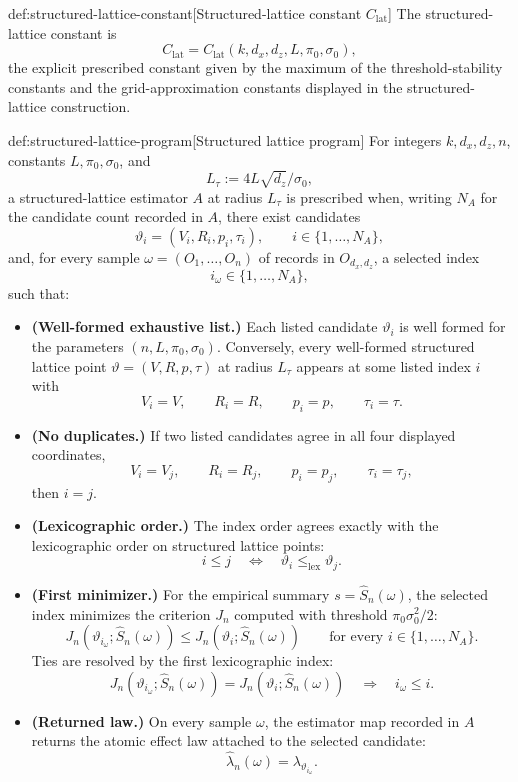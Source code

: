\documentclass[11pt]{article}
\begin{document}
\begin{definitionv}{def:structured-lattice-constant}[Structured-lattice constant \(C_{\mathrm{lat}}\)]
The structured-lattice constant is
\[
C_{\mathrm{lat}}
=
C_{\mathrm{lat}}(k,d_x,d_z,L,\pi_0,\sigma_0),
\]
the explicit prescribed constant given by the maximum of the threshold-stability constants and the grid-approximation constants displayed in the structured-lattice construction.
\end{definitionv}

\begin{algorithmv}{def:structured-lattice-program}[Structured lattice program]
For integers \(k,d_x,d_z,n\), constants \(L,\pi_0,\sigma_0\), and
\[
L_\tau:=4L\sqrt{d_z}/\sigma_0,
\]
a structured-lattice estimator \(A\) at radius \(L_\tau\) is prescribed when, writing \(N_A\) for the candidate count recorded in \(A\), there exist candidates
\[
\vartheta_i=(V_i,R_i,p_i,\tau_i),\qquad i\in\{1,\ldots,N_A\},
\]
and, for every sample \(\omega=(O_1,\ldots,O_n)\) of records in \(O_{d_x,d_z}\), a selected index
\[
i_\omega\in\{1,\ldots,N_A\},
\]
such that:
\begin{itemize}
\item \textbf{(Well-formed exhaustive list.)} Each listed candidate \(\vartheta_i\) is well formed for the parameters \((n,L,\pi_0,\sigma_0)\). Conversely, every well-formed structured lattice point \(\vartheta=(V,R,p,\tau)\) at radius \(L_\tau\) appears at some listed index \(i\) with
\[
V_i=V,\qquad R_i=R,\qquad p_i=p,\qquad \tau_i=\tau .
\]
\item \textbf{(No duplicates.)} If two listed candidates agree in all four displayed coordinates,
\[
V_i=V_j,\qquad R_i=R_j,\qquad p_i=p_j,\qquad \tau_i=\tau_j,
\]
then \(i=j\).
\item \textbf{(Lexicographic order.)} The index order agrees exactly with the lexicographic order on structured lattice points:
\[
i\le j
\quad\Longleftrightarrow\quad
\vartheta_i\le_{\mathrm{lex}}\vartheta_j .
\]
\item \textbf{(First minimizer.)} For the empirical summary \(s=\widehat S_n(\omega)\), the selected index minimizes the criterion \(J_n\) computed with threshold \(\pi_0\sigma_0^2/2\):
\[
J_n(\vartheta_{i_\omega};\widehat S_n(\omega))
\le
J_n(\vartheta_i;\widehat S_n(\omega))
\qquad\text{for every }i\in\{1,\ldots,N_A\}.
\]
Ties are resolved by the first lexicographic index:
\[
J_n(\vartheta_{i_\omega};\widehat S_n(\omega))
=
J_n(\vartheta_i;\widehat S_n(\omega))
\quad\Longrightarrow\quad
i_\omega\le i .
\]
\item \textbf{(Returned law.)} On every sample \(\omega\), the estimator map recorded in \(A\) returns the atomic effect law attached to the selected candidate:
\[
\widehat\lambda_n(\omega)=\lambda_{\vartheta_{i_\omega}} .
\]
\end{itemize}
\end{algorithmv}
\end{document}
